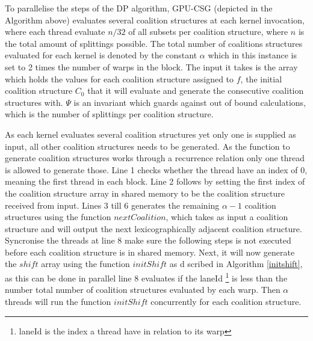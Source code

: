 \documentclass[a4paper, 12pt]{report}
\begin{document}
To parallelise the steps of the DP algorithm, GPU-CSG (depicted in the Algorithm
above) evaluates several coalition structures at each kernel invocation,
where each thread evaluate $n/32$ of all subsets per coalition structure, where
$n$ is the total amount of splittings possible.
The total number of
coalitions structures evaluated for each kernel is denoted by the constant
$\alpha$ which in this instance is set to 2 times the number of warps in the
block. 
The input it takes is the array which holds the values for each
coalition structure assigned to $f$, the initial coalition structure $C_0$ that
it will evaluate and generate the consecutive coalition structures with.
$\Psi$ is an invariant which guards against out of bound
calculations, which is the number of splittings per coalition structure.

As each kernel evaluates several coalition structures yet only one is supplied
as input, all other coalition structures needs to be generated. As the function
to generate coalition structures works through a recurrence relation only one
thread is allowed to generate those. Line 1 checks whether the thread have an
index of 0, meaning the first thread in each block. Line 2 follows by setting
the first index of the coalition structure array in shared memory to be the
coalition structure received from input. Lines 3 till 6 generates the remaining
$\alpha - 1$ coalition structures using the function $nextCoalition$, which
takes as input a coalition structure and will output the next lexicographically
adjacent coalition structure.  Syncronise the threads at line 8 make sure
the following steps is not executed before each coalition structure is in shared
memory. Next, it will now generate the $shift$ array using the function
$initShift$ as d scribed in Algorithm \ref{initshift}, as this can be done in
parallel line 8 
evaluates if the laneId \footnote{laneId is the index a thread have in relation
to its warp} is less than the number total number of coalition structures
evaluated by each warp. Then $\alpha$ threads will run the function $initShift$
concurrently for each coalition structure.
\end{document}
